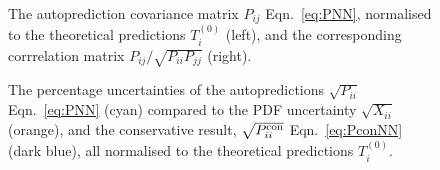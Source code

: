 \begin{figure}[H]
    \begin{center}
  \end{center}
  \vspace{-0.55cm}
  \caption{The autoprediction covariance matrix $P_{ij}$ Eqn.~\ref{eq:PNN}, normalised to the theoretical predictions $T^{(0)}_i$ (left), and the corresponding corrrelation matrix $P_{ij}/\sqrt{P_{ii}P_{jj}}$ (right).}
  \label{fig:P}
    \begin{center}
    \end{center}
  \vspace{-0.55cm}
  \caption{The percentage uncertainties of the autopredictions $\sqrt{P_{ii}}$ Eqn.~\ref{eq:PNN} (cyan) compared to the PDF uncertainty $\sqrt{X_{ii}}$ (orange),  and the conservative result, $\sqrt{P^{\rm con}_{ii}}$ Eqn.~\ref{eq:PconNN} (dark blue), all normalised to the theoretical predictions $T^{(0)}_i$.}
  \label{fig:Pdiag}
\end{figure}

